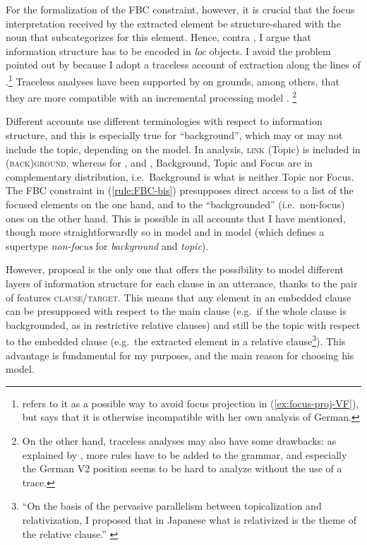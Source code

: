 For the formalization of the FBC constraint, however, it is crucial that the focus interpretation received by the extracted element be structure-shared with the noun that subcategorizes for this element. Hence, contra \citet{DeKuthy.2002}, I argue that information structure has to be encoded in \emph{loc} objects. I avoid the problem pointed out by \citet{DeKuthy.2002} because I adopt a traceless account of extraction along the lines of \citet{Bouma.2001}.\footnote{\citet{DeKuthy.2002} refers to it as a possible way to avoid focus projection in (\ref{ex:focus-proj-VF}), but says that it is otherwise incompatible with her own analysis of German.} Traceless analyses have been supported by \citet{Sag.1994.Fodor,Sag.1996} on grounds, among others, that they are more compatible with an incremental processing model \citep{Pickering.1991,Tanenhaus.2000}.%
\footnote{On the other hand, traceless analyses may also have some drawbacks: as explained by \citet[570--574]{Mueller.S.2016}, more rules have to be added to the grammar, and especially the German V2 position seems to be hard to analyze without the use of a trace.} %


Different accounts use different terminologies with respect to information structure, and this is especially true for ``background'', which may or may not include the topic, depending on the model. In  analysis, \textsc{link} (Topic) is included in \textsc{(back)ground}, whereas for \citet{DeKuthy.2002}, \citet{Bildhauer.2008} and \citet{Song.2017}, Background, Topic and Focus are in complementary distribution, i.e.\ Background is what is neither Topic nor Focus. The FBC constraint in (\ref{rule:FBC-bis}) presupposes direct access to a list of the focused elements on the one hand, and to the ``backgrounded'' (i.e.\ non-focus) ones on the other hand. This is possible in all accounts that I have mentioned, though more straightforwardly so in  model and in  model (which defines a supertype \emph{non-focus} for \emph{background} and \emph{topic}). 


However,  proposal is the only one that offers the possibility to model different layers of information structure for each clause in an utterance, thanks to the pair of features \textsc{clause/target}. This means that any element in an embedded clause can be presupposed with respect to the main clause (e.g.\ if the whole clause is backgrounded, as in restrictive relative clauses) and still be the topic with respect to the embedded clause (e.g.\ the extracted element in a relative clause\footnote{``On the basis of the pervasive parallelism between topicalization and relativization, I proposed that in Japanese what is relativized is the theme of the relative clause.'' \citep[15]{Kuno.1987}}). This advantage is fundamental for my purposes, and the main reason for choosing his model.

